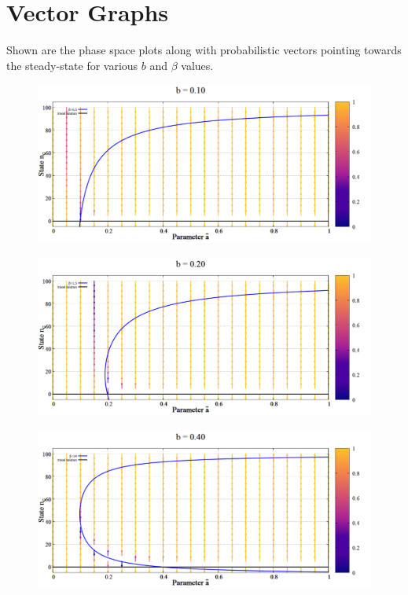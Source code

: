 \newpage
\section{Vector Graphs}
\label{apndx:vectgraph}
Shown are the phase space plots along with probabilistic vectors pointing towards the steady-state for various $b$ and $\beta$ values.

\begin{figure}[h!]
 \centering
  \includegraphics[width=\linewidth]{images/appendix/vectors/1.png}
\end{figure}

\begin{figure}[h!]
 \centering
  \includegraphics[width=\linewidth]{images/appendix/vectors/2.png}
\end{figure}
\newpage
\begin{figure}[h!]
 \centering
  \includegraphics[width=\linewidth]{images/appendix/vectors/3.png}
\end{figure}

